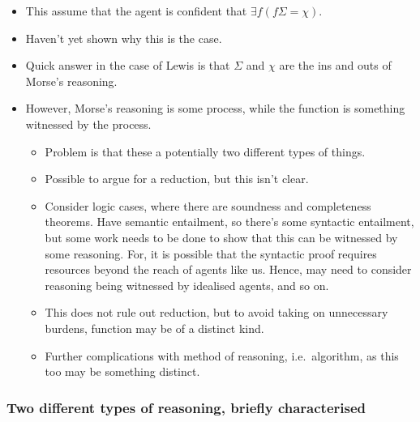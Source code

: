 \documentclass[10pt]{article}
\begin{document}
\begin{itemize}
\item This assume that the agent is confident that \(\exists f(f\Sigma = \chi)\).
\item Haven't yet shown why this is the case.
\item Quick answer in the case of Lewis is that \(\Sigma\) and \(\chi\) are the ins and outs of Morse's reasoning.
\item However, Morse's reasoning is some process, while the function is something witnessed by the process.
  \begin{itemize}
  \item Problem is that these a potentially two different types of things.
  \item Possible to argue for a reduction, but this isn't clear.
  \item Consider logic cases, where there are soundness and completeness theorems.
    Have semantic entailment, so there's some syntactic entailment, but some work needs to be done to show that this can be witnessed by some reasoning.
    For, it is possible that the syntactic proof requires resources beyond the reach of agents like us.
    Hence, may need to consider reasoning being witnessed by idealised agents, and so on.
  \item This does not rule out reduction, but to avoid taking on unnecessary burdens, function may be of a distinct kind.
  \item Further complications with method of reasoning, i.e.\ algorithm, as this too may be something distinct.
  \end{itemize}
\end{itemize}

\subsubsection{Two different types of reasoning, briefly characterised}
\label{sec:two-different-types}
\end{document}
